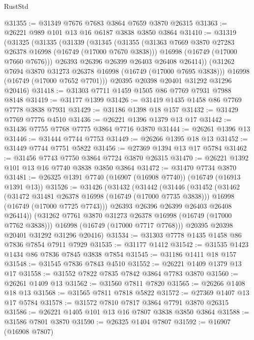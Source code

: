 \begin{lexlean}{RustStd}
\begin{coremodule}
@31355 := @31349 @7676 @7683 @3864 @7659 @3870 @26315
@31363 := @26221 @989 @101 @13 @16 @6187 @3838 @3850 @3864
@31410 := @31319
    (@31325
      (@31335
        (@31339
          (@31345
            (@31355
              (@31363 @7669 @3870 @27283 @26378 @16998 (@16749 (@17000 @7670 @3838)))
              @16998
              (@16749 (@17000 @7660 @7676)))
            @26393
            @26396
            @26399
            @26403
            @26408
            @26414))
        (@31262 @7694 @3870 @31273 @26378 @16998 (@16749 (@17000 @7695 @3838)))
        @16998
        (@16749 (@17000 @7652 @7701)))
      @20395
      @20398
      @20401
      @31292
      @31296
      @20416)
@31418 := @31303 @7711 @1459 @1505 @86 @7769 @7931 @7988 @8148
@31419 := @31177 @1399
@31426 := @31419 @1435 @1458 @86 @7769 @7778 @3838 @7931
@31429 := @31186 @1398 @18 @157
@31432 := @31429 @7769 @7776 @4510
@31436 := @26221 @1396 @1379 @13 @17
@31442 := @31436 @7755 @7768 @7775 @3864 @7716 @3870
@31444 := @26261 @1396 @13
@31446 := @31444 @7744 @7753
@31449 := @26266 @1395 @18 @13
@31452 := @31449 @7744 @7751 @5822
@31456 := @27369 @1394 @13 @17 @5784
@31462 := @31456 @7743 @7750 @3864 @7724 @3870 @26315
@31470 := @26221 @1392 @101 @13 @16 @7740 @3838 @3850 @3864
@31472 := @31470 @7734 @3870
@31481 := @26325 @1391 @7740 (@16907 (@16908 @7740)) (@16749 (@16913 @1391 @13))
@31526 := @31426
    (@31432
      (@31442
        (@31446
          (@31452
            (@31462
              (@31472 @31481 @26378 @16998 (@16749 (@17000 @7735 @3838)))
              @16998
              (@16749 (@17000 @7725 @7743)))
            @26393
            @26396
            @26399
            @26403
            @26408
            @26414))
        (@31262 @7761 @3870 @31273 @26378 @16998 (@16749 (@17000 @7762 @3838)))
        @16998
        (@16749 (@17000 @7717 @7768)))
      @20395
      @20398
      @20401
      @31292
      @31296
      @20416)
@31534 := @31303 @7778 @1435 @1458 @86 @7836 @7854 @7911 @7929
@31535 := @31177 @1412
@31542 := @31535 @1423 @1434 @86 @7836 @7845 @3838 @7854
@31545 := @31186 @1411 @18 @157
@31548 := @31545 @7836 @7843 @4510
@31552 := @26221 @1409 @1379 @13 @17
@31558 := @31552 @7822 @7835 @7842 @3864 @7783 @3870
@31560 := @26261 @1409 @13
@31562 := @31560 @7811 @7820
@31565 := @26266 @1408 @18 @13
@31568 := @31565 @7811 @7818 @5822
@31572 := @27369 @1407 @13 @17 @5784
@31578 := @31572 @7810 @7817 @3864 @7791 @3870 @26315
@31586 := @26221 @1405 @101 @13 @16 @7807 @3838 @3850 @3864
@31588 := @31586 @7801 @3870
@31590 := @26325 @1404 @7807
@31592 := @16907 (@16908 @7807)

\end{coremodule}
\end{lexlean}
